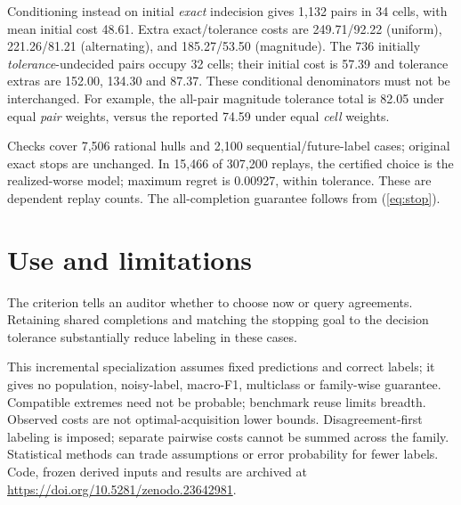 \documentclass[a4paper]{esannV2}
\begin{document}
Conditioning instead on initial \emph{exact} indecision gives 1,132 pairs in
34 cells, with mean initial cost 48.61. Extra exact/tolerance costs are
249.71/92.22 (uniform), 221.26/81.21 (alternating), and 185.27/53.50 (magnitude).
The 736 initially \emph{tolerance}-undecided pairs occupy 32 cells; their
initial cost is 57.39 and tolerance extras are 152.00, 134.30 and 87.37.
These conditional denominators must not be interchanged. For example, the
all-pair magnitude tolerance total is 82.05 under equal \emph{pair} weights,
versus the reported 74.59 under equal \emph{cell} weights.

Checks cover 7,506 rational hulls and 2,100 sequential/future-label cases;
original exact stops are unchanged. In 15,466 of 307,200 replays, the certified choice is the realized-worse model;
maximum regret is 0.00927, within tolerance. These are dependent replay counts.
The all-completion guarantee follows from (\ref{eq:stop}).

\section{Use and limitations}
The criterion tells an auditor whether to choose now or query agreements.
Retaining shared completions and matching the stopping goal to the decision
tolerance substantially reduce labeling in these cases.

This incremental specialization assumes fixed predictions and correct labels;
it gives no population, noisy-label, macro-F1, multiclass or family-wise guarantee.
Compatible extremes need not be probable; benchmark reuse limits breadth.
Observed costs are not optimal-acquisition lower bounds. Disagreement-first
labeling is imposed; separate pairwise costs cannot be summed across the family.
Statistical methods can trade assumptions or error probability for fewer labels.
Code, frozen derived inputs and results are archived at
\url{https://doi.org/10.5281/zenodo.23642981}.
\end{document}
